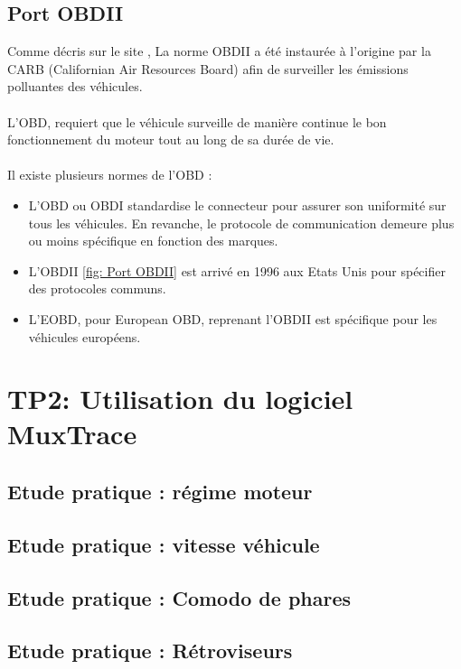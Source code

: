 \documentclass{rapportECC}
\begin{document}
\subsection{Port OBDII}
Comme décris sur le site \cite{klavkarr}, La norme OBDII a été instaurée à l'origine par la CARB (Californian Air Resources Board) afin de surveiller les émissions polluantes des véhicules.  
\\
\\
L'OBD, requiert que le véhicule surveille de manière continue le bon fonctionnement du moteur tout au long de sa durée de vie.
\\
\\
Il existe plusieurs normes de l'OBD : 
\begin{itemize}
    \item L'OBD ou OBDI standardise le connecteur pour assurer son uniformité sur tous les véhicules. En revanche, le protocole de communication demeure plus ou moins spécifique en fonction des marques.
    \item L'OBDII \ref{fig: Port OBDII} est arrivé en 1996 aux Etats Unis pour spécifier des protocoles communs.
    \item L'EOBD, pour European OBD, reprenant l'OBDII est spécifique pour les véhicules européens.
\end{itemize}


\section{TP2: Utilisation du logiciel MuxTrace}

\subsection{Etude pratique : régime moteur}

\subsection{Etude pratique : vitesse véhicule}

\subsection{Etude pratique : Comodo de phares}

\subsection{Etude pratique : Rétroviseurs}
\end{document}
